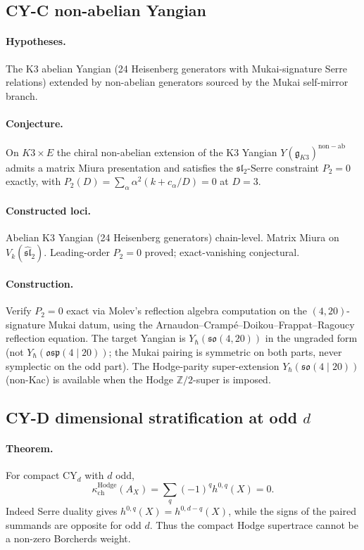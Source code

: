 \subsection*{CY-C non-abelian Yangian}

\paragraph{Hypotheses.} The K3 abelian Yangian (24 Heisenberg
generators with Mukai-signature Serre relations) extended by
non-abelian generators sourced by the Mukai self-mirror branch.

\paragraph{Conjecture.} On $K3 \times E$ the chiral
non-abelian extension of the K3 Yangian
$Y(\mathfrak{g}_{K3})^{\mathrm{non-ab}}$ admits a matrix Miura presentation
and satisfies the $\mathfrak{sl}_2$-Serre constraint $P_2 = 0$ exactly,
with $P_2(D) = \sum_\alpha \alpha^2(k + c_\alpha / D) = 0$ at $D = 3$.

\paragraph{Constructed loci.} Abelian K3 Yangian (24 Heisenberg
generators) chain-level. Matrix Miura on
$V_k(\widehat{\mathfrak{sl}}_2)$. Leading-order $P_2 = 0$ proved;
exact-vanishing conjectural.

\paragraph{Construction.} Verify $P_2 = 0$ exact via Molev's reflection
algebra computation on the $(4, 20)$-signature Mukai datum, using the
Arnaudon--Cramp\'e--Doikou--Frappat--Ragoucy reflection equation. The
target Yangian is $Y_\hbar(\mathfrak{so}(4, 20))$ in the ungraded form
(not $Y_\hbar(\mathfrak{osp}(4 \mid 20))$; the Mukai pairing is symmetric
on both parts, never symplectic on the odd part). The Hodge-parity
super-extension $Y_\hbar(\mathfrak{so}(4 \mid 20))$ (non-Kac) is
available when the Hodge $\mathbb{Z}/2$-super is imposed.

\subsection*{CY-D dimensional stratification at odd $d$}

\paragraph{Theorem.} For compact CY$_d$ with $d$ odd,
\[
 \kappa_{\mathrm{ch}}^{\mathrm{Hodge}}(A_X)
 =
 \sum_q(-1)^q h^{0,q}(X)
 =
0 .
\]
Indeed Serre duality gives $h^{0,q}(X)=h^{0,d-q}(X)$, while the signs
of the paired summands are opposite for odd $d$. Thus the compact Hodge
supertrace cannot be a non-zero Borcherds weight.

